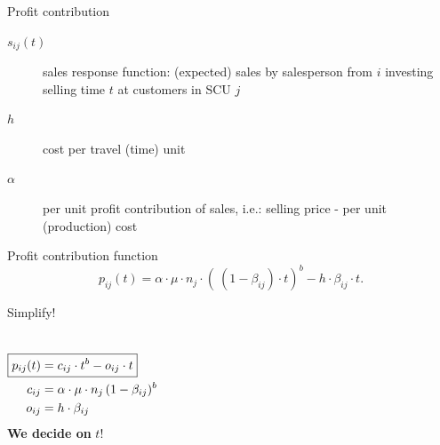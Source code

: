 \begin{frame}{Profit contribution}
\begin{description}
  \item[$s_{ij}(t)$] sales response function: (expected) sales by salesperson from $i$ investing selling time $t$ at customers in SCU $j$ 
  \item[$h$] cost per travel (time) unit
  \item[$\alpha$] per unit profit contribution of sales, i.e.: selling price - per unit (production) cost
\end{description}
\vfill
\begin{block}{Profit contribution function}
\begin{equation}
    p_{ij}(t) = \alpha \cdot \mu \cdot n_j \cdot (\ (1 - \beta_{ij})\cdot t)^b - h \cdot \beta_{ij} \cdot t.
\end{equation}
\end{block}
\end{frame}

\begin{frame}{Simplify!}
\begin{columns}
\centering
\begin{align*}
\Aboxed{p_{ij}(t) &= c_{ij} \cdot t^b - o_{ij} \cdot t}\\
c_{ij} &=  \alpha \cdot \mu \cdot n_j \, (1- \beta_{ij})^b\\
o_{ij} &=  h \cdot \beta_{ij}
\end{align*}
\vfill
\textbf{We decide on} $t$!
\begin{figure}[h!]
	\centering
\scalebox{1.5}{

}
	\label{fig:ProfitContri_Elast}
\end{figure}
\end{columns}
\end{frame}

